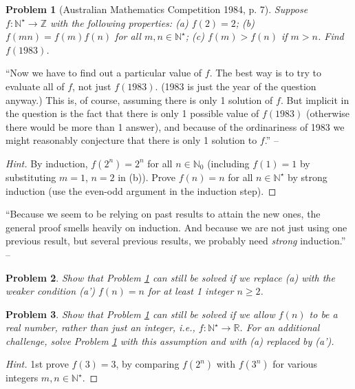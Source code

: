 \documentclass[oneside]{book}
\numberwithin{equation}{section}
\newtheorem{problem}{Problem}[section]
\begin{document}
\begin{problem}[Australian Mathematics Competition 1984, p. 7]
	\label{prob: Australian Mathematics Competition 1984, p. 7}
	Suppose $f:\mathbb{N}^\star\to\mathbb{Z}$ with the following properties: (a) $f(2) = 2$; (b) $f(mn) = f(m)f(n)$ for all $m,n\in\mathbb{N}^\star$; (c) $f(m) > f(n)$ if $m > n$. Find $f(1983)$.
\end{problem}
``Now we have to find out a particular value of $f$. The best way is to try to evaluate all of $f$, not just $f(1983)$. (1983 is just the year of the question anyway.) This is, of course, assuming there is only 1 solution of $f$. But implicit in the question is the fact that there is only 1 possible value of $f(1983)$ (otherwise there would be more than 1 answer), and because of the ordinariness of 1983 we might reasonably conjecture that there is only 1 solution to $f$.'' -- \cite[p. 39]{Tao2006}

\begin{proof}[Hint]
	By induction, $f(2^n) = 2^n$ for all $n\in\mathbb{N}_0$ (including $f(1) = 1$ by substituting $m = 1$, $n = 2$ in (b)). Prove $f(n) = n$ for all $n\in\mathbb{N}^\star$ by strong induction (use the even-odd argument in the induction step). 
\end{proof}
``Because we seem to be relying on past results to attain the new ones, the general proof smells heavily on induction. And because we are not just using one previous result, but several previous results, we probably need \textit{strong} induction.'' -- \cite[p. 40]{Tao2006}

\begin{problem}
	Show that Problem \ref{prob: Australian Mathematics Competition 1984, p. 7} can still be solved if we replace (a) with the weaker condition (a') $f(n) = n$ for at least 1 integer $n\ge 2$.
\end{problem}

\begin{problem}
	Show that Problem \ref{prob: Australian Mathematics Competition 1984, p. 7} can still be solved if we allow $f(n)$ to be a real number, rather than just an integer, i.e., $f:\mathbb{N}^\star\to\mathbb{R}$. For an additional challenge, solve Problem \ref{prob: Australian Mathematics Competition 1984, p. 7} with this assumption and with (a) replaced by (a').
\end{problem}

\begin{proof}[Hint]
	1st prove $f(3) = 3$, by comparing $f(2^n)$ with $f(3^n)$ for various integers $m,n\in\mathbb{N}^\star$.
\end{proof}
\end{document}
